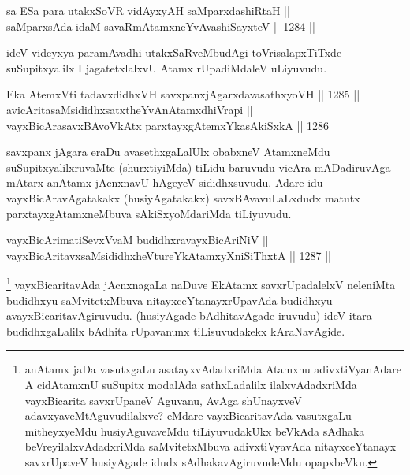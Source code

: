 \begin{shl}
sa ESa para utakxSoVR vidAyxyAH saMparxdashiRtaH ||  \\
saMparxsAda idaM savaRmAtamxneYvAvashiSayxteV ||  1284 ||  
\end{shl}

\begin{artha}
ideV videyxya paramAvadhi utakxSaRveMbudAgi toVrisalapxTiTxde suSupitxyalilx I jagatetxlalxvU Atamx rUpadiMdaleV uLiyuvudu.
\end{artha}


\begin{shl}
Eka AtemxVti tadavxdidhxVH savxpanxjAgarxdavasathxyoVH ||  1285 ||  \\
avicAritasaMsididhxsatxtheYvAnAtamxdhiVrapi || \\
vayxBicArasavxBAvoVkAtx parxtayxgAtemxYkasAkiSxkA ||  1286 ||  
\end{shl}

\begin{artha}
savxpanx jAgara eraDu avasethxgaLalUlx obabxneV AtamxneMdu suSupitxyalilxruvaMte (shurxtiyiMda) tiLidu baruvudu vicAra mADadiruvAga mAtarx anAtamx jAcnxnavU hAgeyeV sididhxsuvudu. Adare idu vayxBicAravAgatakakx (husiyAgatakakx) savxBAvavuLaLxdudx matutx parxtayxgAtamxneMbuva sAkiSxyoMdariMda tiLiyuvudu.
\end{artha}

\begin{shl}
vayxBicArimatiSevxVvaM budidhxravayxBicAriNiV || \\
vayxBicAritavxsaMsididhxheVtureYkAtamxyXniSiThxtA ||  1287 ||  
\end{shl}

\begin{artha}
\footnote{anAtamx jaDa vasutxgaLu asatayxvAdadxriMda Atamxnu adivxtiVyanAdare A cidAtamxnU suSupitx modalAda sathxLadalilx ilalxvAdadxriMda vayxBicarita savxrUpaneV Aguvanu, AvAga shUnayxveV adavxyaveMtAguvudilalxve? eMdare vayxBicaritavAda vasutxgaLu mitheyxyeMdu husiyAguvaveMdu tiLiyuvudakUkx beVkAda sAdhaka beVreyilalxvAdadxriMda saMvitetxMbuva adivxtiVyavAda nitayxceYtanayx savxrUpaveV husiyAgade idudx sAdhakavAgiruvudeMdu opapxbeVku.}
vayxBicaritavAda jAcnxnagaLa naDuve EkAtamx savxrUpadalelxV neleniMta budidhxyu saMvitetxMbuva nitayxceYtanayxrUpavAda budidhxyu avayxBicaritavAgiruvudu. (husiyAgade bAdhitavAgade iruvudu) ideV itara budidhxgaLalilx bAdhita rUpavanunx tiLisuvudakekx kAraNavAgide.
\end{artha}

